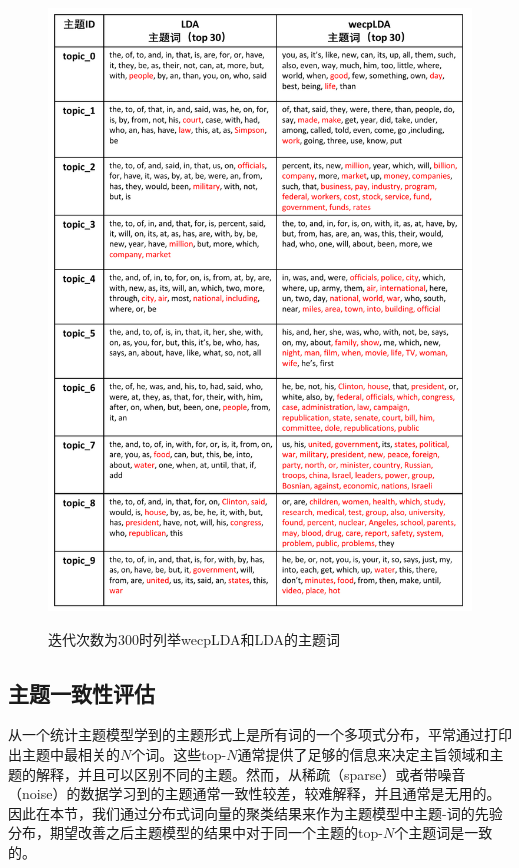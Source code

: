 \documentclass[master]{njuthesis}
\begin{document}
\begin{figure}[htbp]
  \centering
  \includegraphics[width= 1.0\textwidth]{figures//twords_iter100_chap5.pdf}\\
  \caption{迭代次数为300时列举wecpLDA和LDA的主题词}\label{fig:twords_iter300_chap5}
\end{figure}


\subsection{主题一致性评估}\label{subsec_exp_priorLDA_tcoherence_chap5}

从一个统计主题模型学到的主题形式上是所有词的一个多项式分布，平常通过打印出主题中最相关的$N$个词。这些top-$N$通常提供了足够的信息来决定主旨领域和主题的解释，并且可以区别不同的主题。然而，从稀疏（sparse）或者带噪音（noise）的数据学习到的主题通常一致性较差，较难解释，并且通常是无用的。因此在本节，我们通过分布式词向量的聚类结果来作为主题模型中主题-词的先验分布，期望改善之后主题模型的结果中对于同一个主题的top-$N$个主题词是一致的。
\end{document}
